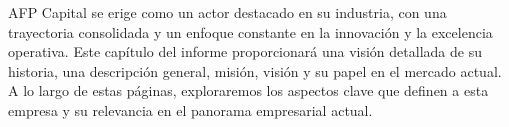 AFP Capital se erige como un actor destacado en su industria, con una trayectoria consolidada y un enfoque constante en la innovación y la excelencia operativa. Este capítulo del informe proporcionará una visión detallada de su historia, una descripción general, misión, visión y su papel en el mercado actual. A lo largo de estas páginas, exploraremos los aspectos clave que definen a esta empresa y su relevancia en el panorama empresarial actual.



